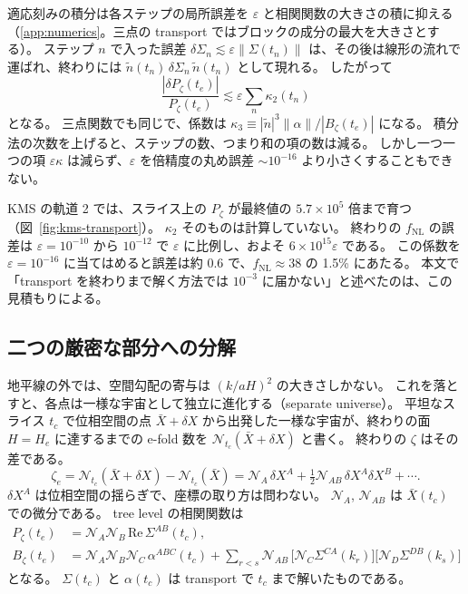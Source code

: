 \documentclass[a4paper,11pt]{ltjsarticle}
\newcommand{\fnl}{f_{\mathrm{NL}}}
\begin{document}
適応刻みの積分は各ステップの局所誤差を $\varepsilon$ と相関関数の大きさの積に抑える（\ref{app:numerics}。三点の transport ではブロックの成分の最大を大きさとする）。
ステップ $n$ で入った誤差 $\delta\Sigma_n\lesssim\varepsilon\|\Sigma(t_n)\|$ は、その後は線形の流れで運ばれ、終わりには $\tilde n(t_n)\,\delta\Sigma_n\,\tilde n(t_n)$ として現れる。
したがって
\begin{equation}
\frac{|\delta P_\zeta(t_e)|}{P_\zeta(t_e)}\lesssim\varepsilon\sum_n\kappa_2(t_n)
\end{equation}
となる。
三点関数でも同じで、係数は $\kappa_3\equiv|\tilde n|^3\|\alpha\|/|B_\zeta(t_e)|$ になる。
積分法の次数を上げると、ステップの数、つまり和の項の数は減る。
しかし一つ一つの項 $\varepsilon\kappa$ は減らず、$\varepsilon$ を倍精度の丸め誤差 $\sim10^{-16}$ より小さくすることもできない。

KMS の軌道 2 では、スライス上の $P_\zeta$ が最終値の $5.7\times10^5$ 倍まで育つ（図~\ref{fig:kms-transport}）。
$\kappa_2$ そのものは計算していない。
終わりの $\fnl$ の誤差は $\varepsilon=10^{-10}$ から $10^{-12}$ で $\varepsilon$ に比例し、およそ $6\times10^{15}\varepsilon$ である。
この係数を $\varepsilon=10^{-16}$ に当てはめると誤差は約 0.6 で、$\fnl\approx38$ の 1.5\% にあたる。
本文で「transport を終わりまで解く方法では $10^{-3}$ に届かない」と述べたのは、この見積もりによる。

\subsection{二つの厳密な部分への分解}

地平線の外では、空間勾配の寄与は $(k/aH)^2$ の大きさしかない。
これを落とすと、各点は一様な宇宙として独立に進化する（separate universe）。
平坦なスライス $t_c$ で位相空間の点 $\bar X+\delta X$ から出発した一様な宇宙が、終わりの面 $H=H_e$ に達するまでの e-fold 数を $\mathcal N_{t_c}(\bar X+\delta X)$ と書く。
終わりの $\zeta$ はその差である。
\begin{equation}
\zeta_e=\mathcal N_{t_c}(\bar X+\delta X)-\mathcal N_{t_c}(\bar X)
=\mathcal N_A\,\delta X^A+\tfrac12\mathcal N_{AB}\,\delta X^A\delta X^B+\cdots .
\end{equation}
$\delta X^A$ は位相空間の揺らぎで、座標の取り方は問わない。
$\mathcal N_A$, $\mathcal N_{AB}$ は $\bar X(t_c)$ での微分である。
tree level の相関関数は
\begin{align}
P_\zeta(t_e)&=\mathcal N_A\mathcal N_B\,\mathrm{Re}\,\Sigma^{AB}(t_c),\\
B_\zeta(t_e)&=\mathcal N_A\mathcal N_B\mathcal N_C\,\alpha^{ABC}(t_c)
+\sum_{r<s}\mathcal N_{AB}\,\big[\mathcal N_C\Sigma^{CA}(k_r)\big]\big[\mathcal N_D\Sigma^{DB}(k_s)\big]
\label{eq:split}
\end{align}
となる。
$\Sigma(t_c)$ と $\alpha(t_c)$ は transport で $t_c$ まで解いたものである。
\end{document}
